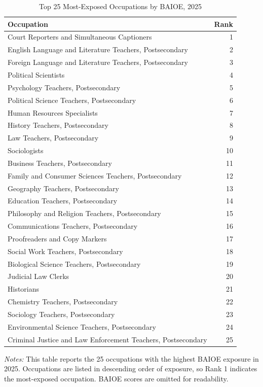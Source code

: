 \begin{table}[htbp]\centering
\caption{Top 25 Most-Exposed Occupations by BAIOE, 2025}\label{tab:top25}
\begin{tabular}{lr}\toprule
Occupation & Rank \\ \midrule
Court Reporters and Simultaneous Captioners & 1 \\
English Language and Literature Teachers, Postsecondary & 2 \\
Foreign Language and Literature Teachers, Postsecondary & 3 \\
Political Scientists & 4 \\
Psychology Teachers, Postsecondary & 5 \\
Political Science Teachers, Postsecondary & 6 \\
Human Resources Specialists & 7 \\
History Teachers, Postsecondary & 8 \\
Law Teachers, Postsecondary & 9 \\
Sociologists & 10 \\
Business Teachers, Postsecondary & 11 \\
Family and Consumer Sciences Teachers, Postsecondary & 12 \\
Geography Teachers, Postsecondary & 13 \\
Education Teachers, Postsecondary & 14 \\
Philosophy and Religion Teachers, Postsecondary & 15 \\
Communications Teachers, Postsecondary & 16 \\
Proofreaders and Copy Markers & 17 \\
Social Work Teachers, Postsecondary & 18 \\
Biological Science Teachers, Postsecondary & 19 \\
Judicial Law Clerks & 20 \\
Historians & 21 \\
Chemistry Teachers, Postsecondary & 22 \\
Sociology Teachers, Postsecondary & 23 \\
Environmental Science Teachers, Postsecondary & 24 \\
Criminal Justice and Law Enforcement Teachers, Postsecondary & 25 \\
\bottomrule\end{tabular}
\begin{minipage}{0.95\linewidth}\footnotesize \textit{Notes:} This table reports the 25 occupations with the highest BAIOE exposure in 2025. Occupations are listed in descending order of exposure, so Rank 1 indicates the most-exposed occupation. BAIOE scores are omitted for readability.\end{minipage}
\end{table}

